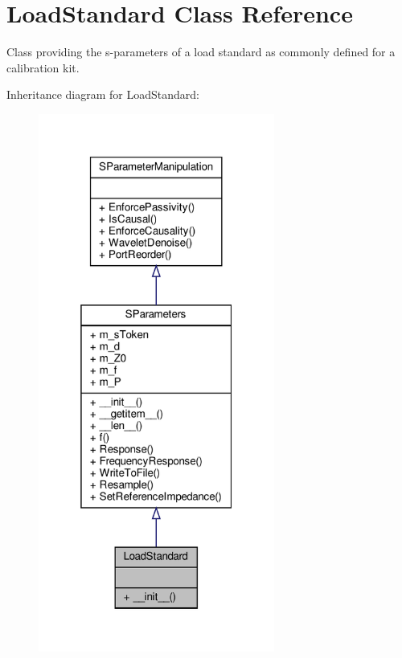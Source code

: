 \hypertarget{classSignalIntegrity_1_1Measurement_1_1CalKit_1_1Standards_1_1LoadStandard_1_1LoadStandard}{}\section{Load\+Standard Class Reference}
\label{classSignalIntegrity_1_1Measurement_1_1CalKit_1_1Standards_1_1LoadStandard_1_1LoadStandard}


Class providing the s-\/parameters of a load standard as commonly defined for a calibration kit.  




Inheritance diagram for Load\+Standard\+:
\nopagebreak
\begin{figure}[H]
\begin{center}
\leavevmode
\includegraphics[width=220pt]{classSignalIntegrity_1_1Measurement_1_1CalKit_1_1Standards_1_1LoadStandard_1_1LoadStandard__inherit__graph}
\end{center}
\end{figure}


